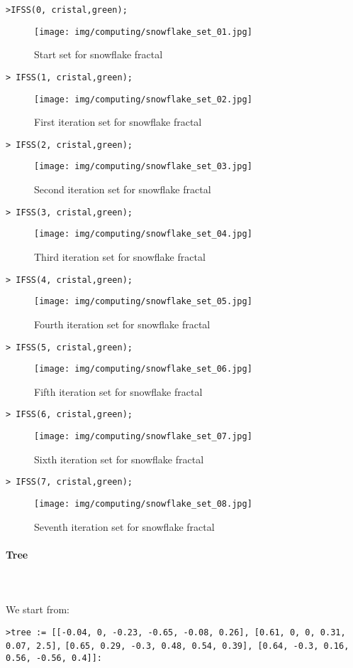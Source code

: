 	\texttt{>IFSS(0, cristal,green);}
	\begin{figure}[H]
		\centering
		\texttt{[image: img/computing/snowflake\_set\_01.jpg]}
		\caption[]{Start set for snowflake fractal}
	\end{figure}
	\texttt{> IFSS(1, cristal,green);}
	\begin{figure}[H]
		\centering
		\texttt{[image: img/computing/snowflake\_set\_02.jpg]}
		\caption[]{First iteration set for snowflake fractal}
	\end{figure}
	\texttt{> IFSS(2, cristal,green);}
	\begin{figure}[H]
		\centering
		\texttt{[image: img/computing/snowflake\_set\_03.jpg]}
		\caption[]{Second iteration set for snowflake fractal}
	\end{figure}
	\texttt{> IFSS(3, cristal,green);}
	\begin{figure}[H]
		\centering
		\texttt{[image: img/computing/snowflake\_set\_04.jpg]}
		\caption[]{Third iteration set for snowflake fractal}
	\end{figure}
	\texttt{> IFSS(4, cristal,green);}
	\begin{figure}[H]
		\centering
		\texttt{[image: img/computing/snowflake\_set\_05.jpg]}
		\caption[]{Fourth iteration set for snowflake fractal}
	\end{figure}
	\texttt{> IFSS(5, cristal,green);}
	\begin{figure}[H]
		\centering
		\texttt{[image: img/computing/snowflake\_set\_06.jpg]}
		\caption[]{Fifth iteration set for snowflake fractal}
	\end{figure}
	\texttt{> IFSS(6, cristal,green);}
	\begin{figure}[H]
		\centering
		\texttt{[image: img/computing/snowflake\_set\_07.jpg]}
		\caption[]{Sixth iteration set for snowflake fractal}
	\end{figure}
	\texttt{> IFSS(7, cristal,green);}
	\begin{figure}[H]
		\centering
		\texttt{[image: img/computing/snowflake\_set\_08.jpg]}
		\caption[]{Seventh iteration set for snowflake fractal}
	\end{figure}
	
	\pagebreak
	\paragraph{Tree}\mbox{}\\\\
	We start from:
	
	\texttt{>tree := [[-0.04, 0, -0.23, -0.65, -0.08, 0.26], [0.61, 0, 0, 0.31, 0.07, 2.5],}
	\texttt{[0.65, 0.29, -0.3, 0.48, 0.54, 0.39], [0.64, -0.3, 0.16, 0.56, -0.56, 0.4]]:}

